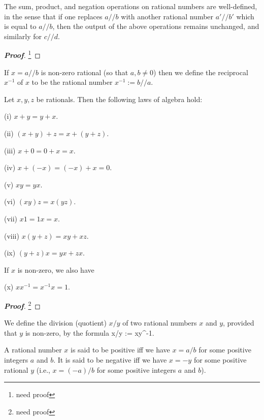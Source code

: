 \begin{lemma}
The sum, product, and negation operations on rational numbers are well-defined, in the sense that if one replaces $a//b$ with another rational number $a'//b'$ which is equal to $a//b$, then the output of the above operations remains unchanged, and similarly for $c//d$.
\end{lemma}

\begin{proof}[\bf Proof]
\footnote{need proof}
\end{proof}

\begin{definition}
If $x=a//b$ is non-zero rational (so that $a,b\neq 0$) then we define the reciprocal $x^{-1}$ of $x$ to be the rational number $x^{-1}:=b//a$.
\end{definition}

\begin{proposition}
Let $x,y,z$ be rationals. Then the following laws of algebra hold:
\ben
\item [(i)] $x+y = y+x$.
\item [(ii)] $(x+y) + z = x+(y+z)$.
\item [(iii)] $x+0=0+x = x$.
\item [(iv)] $x+(-x) = (-x)+x = 0$.
\item [(v)] $xy = yx$.
\item [(vi)] $(xy)z = x(yz)$.
\item [(vii)] $x1 = 1x = x$.
\item [(viii)] $x(y+z) = xy + xz$.
\item [(ix)] $(y+z)x = yx + zx$.
\een

If $x$ is non-zero, we also have
\ben
\item [(x)] $xx^{-1} = x^{-1}x = 1$.
\een
\end{proposition}

\begin{proof}[\bf Proof]
\footnote{need proof}
\end{proof}

\begin{definition}
We define the division (quotient) $x/y$ of two rational numbers $x$ and $y$, provided that $y$ is non-zero, by the formula
\be
x/y := x\times y^{-1}.
\ee
\end{definition}

\begin{definition}
A rational number $x$ is said to be positive iff we have $x = a/b$ for some positive integers $a$ and $b$. It is said to be negative iff we have $x=-y$ for some positive rational $y$ (i.e., $x= (-a)/b$ for some positive integers $a$ and $b$).
\end{definition}

